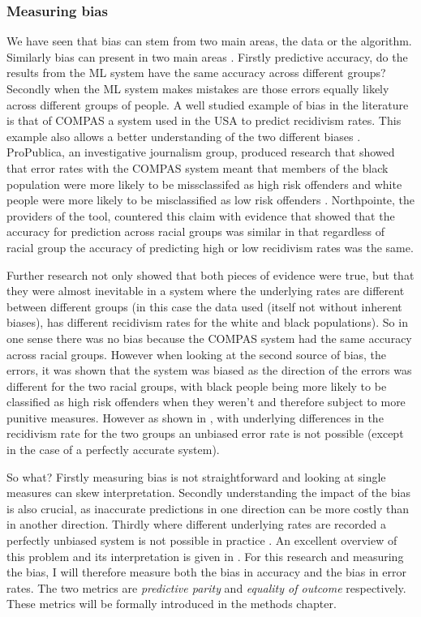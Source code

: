 \subsubsection{Measuring bias} We have seen that bias can stem from two main areas, the data or the algorithm. Similarly bias can present in two main areas \parencite{chouldechova2017fair}. Firstly predictive accuracy, do the results from the ML system have the same accuracy across different groups? Secondly when the ML system makes mistakes are those errors equally likely across different groups of people. A well studied example of bias in the literature is that of COMPAS a system used in the USA to predict recidivism rates. This example also allows a better understanding of the two different biases \parencite{kleinberg2016inherent, chouldechova2017fair}.  ProPublica, an investigative journalism group, produced research that showed that error rates with the COMPAS system meant that members of the black population were more likely to be missclassifed as high risk offenders and white people were more likely to be misclassified as low risk offenders  \parencite{jefflarson_2016}. Northpointe, the providers of the tool, countered this claim with evidence that showed that the accuracy for prediction across racial groups was similar in that regardless of racial group the accuracy of predicting high or low recidivism rates was the same. 

Further research  \parencite{kleinberg2016inherent, chouldechova2017fair} not only showed that both pieces of evidence were true, but that they were almost inevitable in a system where the underlying rates are different between different groups (in this case the data used (itself not without inherent biases), has different recidivism rates for the white and black populations).  So in one sense there was no bias because the COMPAS system had the same accuracy across racial groups. However when looking at the second source of bias, the errors, it was shown that the system was biased as the direction of the errors was different for the two racial groups, with black people being more likely to be classified as high risk offenders when they weren't and therefore subject to more punitive measures. However as shown in \textcite{kleinberg2016inherent}, with underlying differences in the recidivism rate for the two groups an unbiased error rate is not possible (except in the case of a perfectly accurate system). 

So what? Firstly measuring bias is not straightforward and looking at single measures can skew interpretation. Secondly understanding the impact of the bias is also crucial, as inaccurate predictions in one direction can be more costly than in another direction. Thirdly where different underlying rates are recorded a perfectly unbiased system is not possible in practice \parencite{kleinberg2016inherent}. An excellent overview of this problem and its interpretation is given in \parencite{hellman2020measuring}. For this research and measuring the bias, I will therefore measure both the bias in accuracy and the bias in error rates. The two metrics are \emph{predictive parity} and \emph{equality of outcome} respectively. These metrics will be formally introduced in the methods chapter.  




